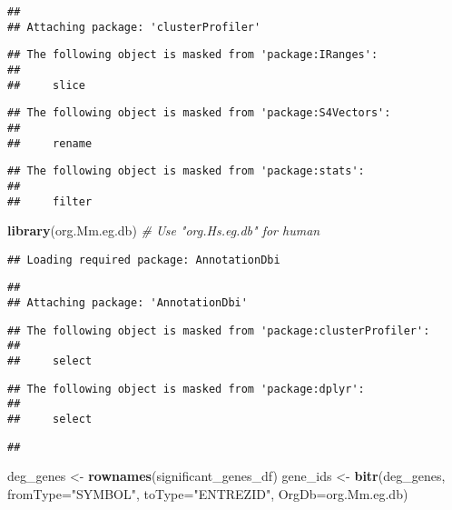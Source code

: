 \documentclass[
]{article}
\newenvironment{Shaded}{\begin{snugshade}}{\end{snugshade}}
\newcommand{\AttributeTok}[1]{\textcolor[rgb]{0.13,0.29,0.53}{#1}}
\newcommand{\CommentTok}[1]{\textcolor[rgb]{0.56,0.35,0.01}{\textit{#1}}}
\newcommand{\FunctionTok}[1]{\textcolor[rgb]{0.13,0.29,0.53}{\textbf{#1}}}
\newcommand{\NormalTok}[1]{#1}
\newcommand{\OtherTok}[1]{\textcolor[rgb]{0.56,0.35,0.01}{#1}}
\newcommand{\StringTok}[1]{\textcolor[rgb]{0.31,0.60,0.02}{#1}}
\begin{document}
\begin{verbatim}
## 
## Attaching package: 'clusterProfiler'
\end{verbatim}

\begin{verbatim}
## The following object is masked from 'package:IRanges':
## 
##     slice
\end{verbatim}

\begin{verbatim}
## The following object is masked from 'package:S4Vectors':
## 
##     rename
\end{verbatim}

\begin{verbatim}
## The following object is masked from 'package:stats':
## 
##     filter
\end{verbatim}

\begin{Shaded}
\begin{Highlighting}[]
\FunctionTok{library}\NormalTok{(org.Mm.eg.db)  }\CommentTok{\# Use "org.Hs.eg.db" for human}
\end{Highlighting}
\end{Shaded}

\begin{verbatim}
## Loading required package: AnnotationDbi
\end{verbatim}

\begin{verbatim}
## 
## Attaching package: 'AnnotationDbi'
\end{verbatim}

\begin{verbatim}
## The following object is masked from 'package:clusterProfiler':
## 
##     select
\end{verbatim}

\begin{verbatim}
## The following object is masked from 'package:dplyr':
## 
##     select
\end{verbatim}

\begin{verbatim}
## 
\end{verbatim}

\begin{Shaded}
\begin{Highlighting}[]
\NormalTok{deg\_genes }\OtherTok{\textless{}{-}} \FunctionTok{rownames}\NormalTok{(significant\_genes\_df)}
\NormalTok{gene\_ids }\OtherTok{\textless{}{-}} \FunctionTok{bitr}\NormalTok{(deg\_genes, }\AttributeTok{fromType=}\StringTok{"SYMBOL"}\NormalTok{, }\AttributeTok{toType=}\StringTok{"ENTREZID"}\NormalTok{, }\AttributeTok{OrgDb=}\NormalTok{org.Mm.eg.db)}
\end{Highlighting}
\end{Shaded}
\end{document}
